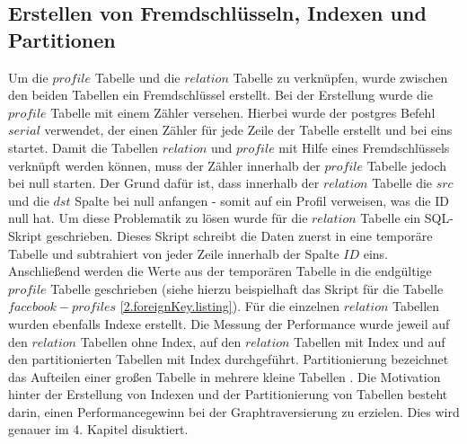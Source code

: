 \subsection{Erstellen von Fremdschlüsseln, Indexen und Partitionen}
Um die $profile$ Tabelle und die $relation$ Tabelle zu verknüpfen, wurde zwischen den beiden Tabellen ein Fremdschlüssel erstellt.
Bei der Erstellung wurde die $profile$ Tabelle mit einem Zähler versehen.
Hierbei wurde der postgres Befehl $serial$ verwendet, der einen Zähler für jede Zeile der Tabelle erstellt und bei eins startet.
Damit die Tabellen $relation$ und $profile$ mit Hilfe eines Fremdschlüssels verknüpft werden können, muss der Zähler innerhalb der $profile$ Tabelle jedoch bei null starten.
Der Grund dafür ist, dass innerhalb der $relation$ Tabelle die $src$ und die $dst$ Spalte bei null anfangen - somit auf ein Profil verweisen, was die ID null hat.
Um diese Problematik zu lösen wurde für die $relation$ Tabelle ein SQL-Skript geschrieben.
Dieses Skript schreibt die Daten zuerst in eine temporäre Tabelle und subtrahiert von jeder Zeile innerhalb der Spalte $ID$ eins.
Anschließend werden die Werte aus der temporären Tabelle in die endgültige $profile$ Tabelle geschrieben (siehe hierzu beispielhaft das Skript für die Tabelle $facebook-profiles$ \ref{2.foreignKey.listing}).
Für die einzelnen $relation$ Tabellen wurden ebenfalls Indexe erstellt.
Die Messung der Performance wurde jeweil auf den $relation$ Tabellen ohne Index, auf den $relation$ Tabellen mit Index und auf den partitionierten Tabellen mit Index durchgeführt.
Partitionierung bezeichnet das Aufteilen einer großen Tabelle in mehrere kleine Tabellen \cite{postgrespartitioning}.
Die Motivation hinter der Erstellung von Indexen und der Partitionierung von Tabellen besteht darin, einen Performancegewinn bei der Graphtraversierung zu erzielen.
Dies wird genauer im 4. Kapitel disuktiert.


